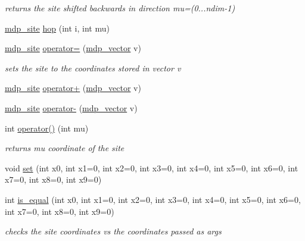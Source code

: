 \begin{CompactItemize}
\begin{CompactList}\small\item\em returns the site shifted backwards in direction mu=(0...ndim-1) \item\end{CompactList}\item 
\hyperlink{classmdp__site}{mdp\_\-site} \hyperlink{classmdp__site_5982cae4c0bf2c255a978529dc6afe6c}{hop} (int i, int mu)
\item 
\hypertarget{classmdp__site_a4931841d551417b526a2d2d22751471}{
\hyperlink{classmdp__site}{mdp\_\-site} \hyperlink{classmdp__site_a4931841d551417b526a2d2d22751471}{operator=} (\hyperlink{classmdp__vector}{mdp\_\-vector} v)}
\label{classmdp__site_a4931841d551417b526a2d2d22751471}

\begin{CompactList}\small\item\em sets the site to the coordinates stored in vector v \item\end{CompactList}\item 
\hyperlink{classmdp__site}{mdp\_\-site} \hyperlink{classmdp__site_5fc9e1550603644416108c92cbf3cab8}{operator+} (\hyperlink{classmdp__vector}{mdp\_\-vector} v)
\item 
\hyperlink{classmdp__site}{mdp\_\-site} \hyperlink{classmdp__site_20d26e5db480233e64bde96eb67180fc}{operator-} (\hyperlink{classmdp__vector}{mdp\_\-vector} v)
\item 
\hypertarget{classmdp__site_bbbb7f94657ed5112919578d63a3272c}{
int \hyperlink{classmdp__site_bbbb7f94657ed5112919578d63a3272c}{operator()} (int mu)}
\label{classmdp__site_bbbb7f94657ed5112919578d63a3272c}

\begin{CompactList}\small\item\em returns mu coordinate of the site \item\end{CompactList}\item 
void \hyperlink{classmdp__site_241eb259576cbe7354d1ff714d22416c}{set} (int x0, int x1=0, int x2=0, int x3=0, int x4=0, int x5=0, int x6=0, int x7=0, int x8=0, int x9=0)
\item 
\hypertarget{classmdp__site_0bf9ef3d304245c68e00d7b66886f020}{
int \hyperlink{classmdp__site_0bf9ef3d304245c68e00d7b66886f020}{is\_\-equal} (int x0, int x1=0, int x2=0, int x3=0, int x4=0, int x5=0, int x6=0, int x7=0, int x8=0, int x9=0)}
\label{classmdp__site_0bf9ef3d304245c68e00d7b66886f020}

\begin{CompactList}\small\item\em checks the site coordinates vs the coordinates passed as args \item\end{CompactList}\end{CompactItemize}
